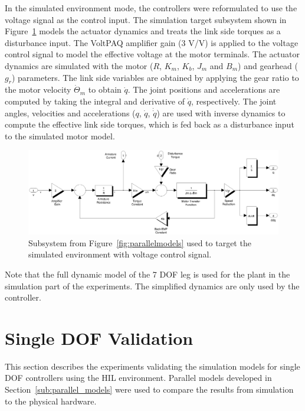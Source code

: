 In the simulated environment mode, the controllers were reformulated to use the voltage signal as the control input. The simulation target subsystem shown in Figure~\ref{fig:simmodel} models the actuator dynamics and treats the link side torques as a disturbance input. The VoltPAQ amplifier gain ($3$ V/V) is applied to the voltage control signal to model the effective voltage at the motor terminals. The actuator dynamics are simulated with the motor ($R$, $K_m$, $K_b$, $J_m$ and $B_m$) and gearhead ($g_r$) parameters. The link side variables are obtained by applying the gear ratio to the motor velocity $\dot{\Theta}_m$ to obtain $\dot{q}$. The joint positions and accelerations are computed by taking the integral and derivative of $\dot{q}$, respectively. The joint angles, velocities and accelerations ($q$, $\dot{q}$, $\dot{\dot{q}}$) are used with inverse dynamics to compute the effective link side torques, which is fed back as a disturbance input to the simulated motor model. 

\begin{figure}[!h]
	\centering
    \includegraphics[scale=0.5]{fig/experiments/simmodel.eps} 
  	\caption{Subsystem from Figure~\ref{fig:parallelmodels} used to target the simulated environment with voltage control signal.}
	\label{fig:simmodel}
\end{figure}

Note that the full dynamic model of the 7 DOF leg is used for the plant in the simulation part of the experiments. The simplified dynamics are only used by the controller. 



\section{Single DOF Validation} %
\label{sec:1dof_validation}
This section describes the experiments validating the simulation models for single DOF controllers using the HIL environment. Parallel models developed in Section~\ref{sub:parallel_models} were used to compare the results from simulation to the physical hardware. 

